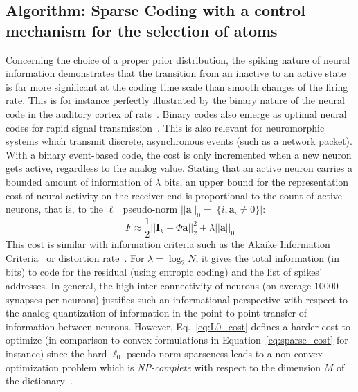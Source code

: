 \documentclass[draft]{article} %
\newcommand{\coef}{\mathbf{a}} %
\newcommand{\image}{\mathbf{I}} %
\newcommand{\dico}{\Phi} %
\newcommand{\enscond}[2]{\lbrace #1, #2 \rbrace}
\newcommand{\norm}[1]{|\!| #1 |\!|}
\newcommand{\abs}[1]{\left|#1\right|}
\newcommand{\seeEq}[1]{Eq.~\ref{eq:#1}}%
\begin{document}
\subsection{Algorithm: Sparse Coding with a control mechanism for the selection of atoms}
Concerning the choice of a proper prior distribution, the spiking nature of neural information demonstrates that the transition from an inactive to an active state is far more significant at the coding time scale than smooth changes of the firing rate.
This is for instance perfectly illustrated by the binary nature of the neural code in the auditory cortex of rats~\citep{DeWeese03}. Binary codes also emerge as optimal neural codes for rapid signal transmission~\citep{Bethge03}. This is also relevant for neuromorphic systems which transmit discrete, asynchronous events (such as a network packet). With a binary event-based code, the cost is only incremented when a new neuron gets active, regardless to the analog value. Stating that an active neuron carries a bounded amount of information of $\lambda$ bits, an upper bound for the representation cost of neural activity on the receiver end is proportional to the count of active neurons, that is, to the $\ell_0$ pseudo-norm $\norm{\coef}_0 = \abs{\enscond{i}{\coef_i \neq 0}}$:%
\begin{equation}%
F \approx  \frac{1}{2} \norm{\image_k - \dico \coef}_2^2 + \lambda\norm{\coef}_0%
\label{eq:L0_cost}%
\end{equation}%
This cost is similar with information criteria such as the Akaike Information Criteria~\citep{Akaike74} or distortion rate~\citep[p.~571]{Mallat98}. For $\lambda=\log_2 N$, it gives the total information (in bits) to code for the residual (using entropic coding) and the list of spikes' addresses. In general, the high inter-connectivity of neurons (on average $10000$ synapses per neurons) justifies such an informational perspective with respect to the analog quantization of information in the point-to-point transfer of information between neurons.
However, \seeEq{L0_cost} defines a harder cost to optimize (in comparison to convex formulations in Equation~\ref{eq:sparse_cost} for instance) since the hard $\ell_0$ pseudo-norm sparseness leads to a non-convex optimization problem which is \emph{NP-complete} with respect to the dimension $M$ of the dictionary~\citep[p.~418]{Mallat98}.
\end{document}
